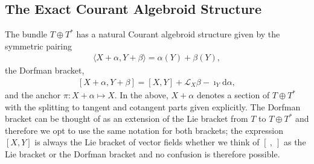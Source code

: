 \documentclass{article}
\newcommand{\TT}{{T\oplus T^*}}
\newcommand{\Lie}{\mathcal{L}}
\newcommand{\ap}{\alpha}
\newcommand{\bt}{\beta}
\newcommand{\rd}{\mathrm{d}}
\newcommand{\brac}{[\ ,\ ]}
\theoremstyle{definition}
\theoremstyle{definition}
\theoremstyle{remark}
\begin{document}
\subsection{The Exact Courant Algebroid Structure}
The bundle $\TT$ has a natural Courant algebroid structure given by the symmetric pairing
\begin{align*}
\langle X+\ap,Y+\bt\rangle=\ap(Y)+\bt(Y),
\end{align*}
the Dorfman bracket,
\begin{align}\label{eq:dorfman}
[ X+\ap,Y+\bt]=[X,Y]+\Lie_X\bt-\imath_Y\rd \ap, 
\end{align}
and the anchor $\pi:X+\ap\mapsto X$. In the above, $X+\ap$ denotes a section of $\TT$ with the splitting to tangent and cotangent parts given explicitly. The Dorfman bracket can be thought of as an extension of the Lie bracket from $T$ to $\TT$ and therefore we opt to use the same notation for both brackets; the expression $[X,Y]$ is always the Lie bracket of vector fields whether we think of $\brac$ as the Lie bracket or the Dorfman bracket and no confusion is therefore possible.
\end{document}
